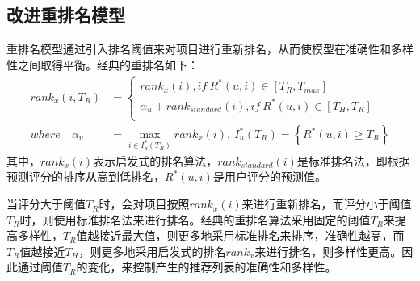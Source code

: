 \documentclass[master,winfonts]{njuthesis}
\begin{document}
\subsection{改进重排名模型}
重排名模型通过引入排名阈值来对项目进行重新排名，从而使模型在准确性和多样性之间取得平衡。经典的重排名如下：
\begin{equation}
\begin{aligned}
rank_x(i,T_R) &= \left\{  
             \begin{array}{lr}  
            rank_x(i) ,if \ R^*(u,i)\in \left [ T_R,T_{max} \right ] &\\  
             \alpha_u+rank_{standard}(i),if \ R^*(u,i) \in \left [ T_H,T_R \right ]&\\  
      
             \end{array}  
\right.\\
where \quad \alpha_u &= \max \limits_{i \in I^*_u(T_R)}rank_x(i),\ I^*_u(T_R) =\left \{R^*(u,i)\geq T_R  \right \}
\end{aligned}
\end{equation}
其中，$rank_x(i)$表示启发式的排名算法，$rank_{standard}(i)$是标准排名法，即根据预测评分的排序从高到低排名，$R^*(u,i)$是用户评分的预测值。

当评分大于阈值$T_R$时，会对项目按照$rank_x(i)$来进行重新排名，而评分小于阈值$T_R$时，则使用标准排名法来进行排名。经典的重排名算法采用固定的阈值$T_R$来提高多样性，$T_R$值越接近最大值，则更多地采用标准排名来排序，准确性越高，而$T_R$值越接近$T_H$，则更多地采用启发式的排名$rank_x$来进行排名，则多样性更高。因此通过阈值$T_R$的变化，来控制产生的推荐列表的准确性和多样性。
\end{document}
